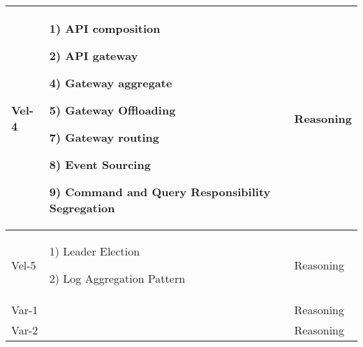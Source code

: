 \documentclass[conference]{IEEEtran}
\begin{document}
\begin{center}
\begin{table*}
\begin{tabular}{ | m{2cm} | m{8cm} |  m{2cm} |}
        Vel-4 &  

        1) API composition
        
        2) API gateway

        4) Gateway aggregate

        5) Gateway Offloading
        
        7) Gateway routing 
        
        8) Event Sourcing

        9) Command and Query Responsibility Segregation

        & Reasoning
        
        \\
        \hline

        Vel-5 &  

        1) Leader Election 

        2) Log Aggregation Pattern 

        & Reasoning
        
        \\
        \hline

        
        Var-1 &  
        

        & Reasoning
        
        \\
        \hline

        Var-2 &  
        

        & Reasoning
        
        \\
        \hline
  
    \end{tabular}
    \end{table*}
\end{center}


    


\end{document}
